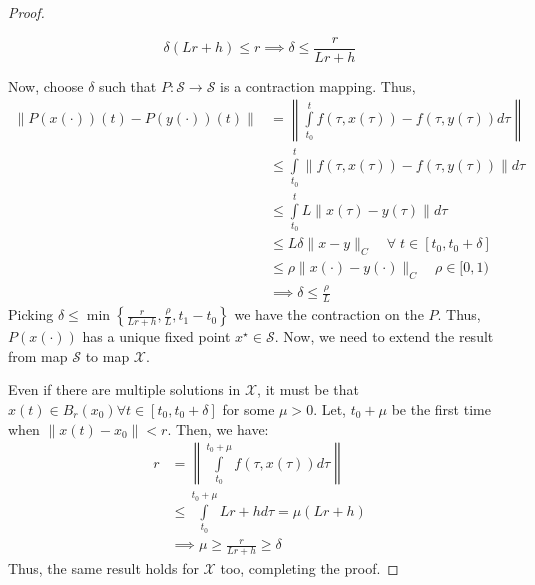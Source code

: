 \begin{proof}
\begin{observe}[2]
\[            \delta (Lr + h) \leq r \implies \delta \leq \frac{r}{Lr + h}  
        \]
    \end{observe}
    Now, choose \(\delta \) such that \(P: \mathcal{S} \to \mathcal{S} \) is a contraction mapping. Thus,
    \[
        \begin{aligned}
            \lVert P(x(\cdot))(t) - P(y(\cdot))(t) \rVert &= \left\lVert \int\limits_{t_0}^{t} f(\tau, x(\tau)) -
             f(\tau, y(\tau)) d\tau \right\rVert \\
                &\leq \int\limits_{t_0}^{t} \lVert f(\tau, x(\tau)) - f(\tau, y(\tau)) \rVert d\tau \\
                &\leq \int\limits_{t_0}^{t} L \lVert x(\tau) - y(\tau) \rVert d\tau \\
                &\leq L \delta \lVert x - y \rVert_C \quad \forall \; t \in [t_0, t_0 + \delta] \\
                &\leq \rho \lVert x(\cdot) - y(\cdot) \rVert_C \quad \rho \in [0,1)\\
                & \implies  \delta \leq \frac{\rho}{L}
        \end{aligned}
    \]
    Picking \(\delta \leq \min\left\{ \frac{r}{Lr + h}, \frac{\rho}{L}, t_1 - t_0 \right\}\) we have the contraction
    on the \(P\). Thus, \(P(x(\cdot))\) has a unique fixed point \(x^{\star} \in \mathcal{S}\). Now,
    we need to extend the result from map \(\mathcal{S}\) to map \(\mathcal{X}\).

    Even if there are multiple solutions in \(\mathcal{X}\), it must be that \(x(t) \in B_r(x_0) \forall 
    t \in [t_0, t_0 + \delta]\) for some \(\mu > 0 \).
    Let, \(t_0 + \mu \) be the first time when \(\lVert x(t) - x_0 \rVert < r \). Then, we have:
    \[
    \begin{aligned}
        r &= \left\lVert \int\limits_{t_0}^{t_0 + \mu} f(\tau, x(\tau)) d\tau \right\rVert \\
        &\leq \int\limits_{t_0}^{t_0 + \mu} Lr + h d\tau = \mu (Lr + h) \\
        &\implies \mu \geq \frac{r}{Lr + h} \geq \delta
    \end{aligned}    
    \]
    Thus, the same result holds for \(\mathcal{X}\) too, completing the proof.
\end{proof}
